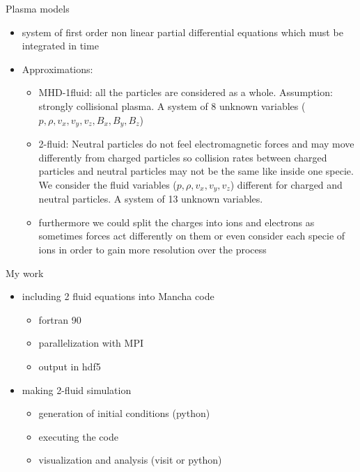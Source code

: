 \documentclass{beamer}
\begin{document}
\begin{frame}{Plasma models}
\begin{itemize}
\item system of first order non linear partial differential equations which must be integrated in time
\item Approximations:
\begin{itemize}
\item MHD-1fluid: all the particles are considered as a whole. Assumption: strongly collisional plasma. A system of 8 unknown variables
($p,\rho,v_x,v_y,v_z,B_x,B_y,B_z$)
\item 2-fluid: Neutral particles do not feel electromagnetic forces and may move  differently from charged particles so collision rates between 
charged particles and neutral particles may not be the same like inside one specie. 
We consider the fluid variables ($p,\rho,v_x,v_y,v_z$) different for charged and neutral particles. A system of 13 unknown variables.
\item furthermore we could split the charges into ions and electrons as sometimes forces act differently on them or even consider each specie of ions
in order to gain more resolution over the process
\end{itemize}
\end{itemize}
\end{frame}

\begin{frame}{My work}
\begin{itemize}
\item including 2 fluid equations into  Mancha code
\begin{itemize}
\item fortran 90
\item parallelization with MPI
\item output in hdf5
\end{itemize}
\item making 2-fluid simulation
\begin{itemize}
\item generation of initial conditions (python)
\item executing the code
\item visualization  and analysis (visit or python)
\end{itemize}
\end{itemize}
\end{frame}
\end{document}
